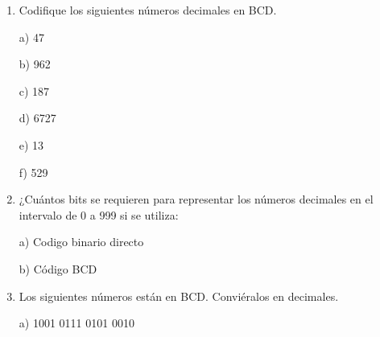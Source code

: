 \documentclass[a4paper, 12pt]{article}
\newcommand{\Aspace}{0.2cm}
\begin{document}
\begin{enumerate}
        \item Codifique los siguientes números decimales en BCD.
            \vspace{\Aspace} \par
            a) 47
            \\ { \color{azul}  }

            \vspace{\Aspace} \par
            b) 962
            \\ { \color{azul}  }

            \vspace{\Aspace} \par
            c) 187
            \\ { \color{azul}  }

            \vspace{\Aspace} \par
            d) 6727
            \\ { \color{azul}  }

            \vspace{\Aspace} \par
            e) 13
            \\ { \color{azul}  }

            \vspace{\Aspace} \par
            f) 529
            \\ { \color{azul}  }


        \item ¿Cuántos bits se requieren para representar los números decimales en el intervalo de 0 a 999 si se utiliza:
            \vspace{\Aspace} \par
            a) Codigo binario directo
            \\ { \color{azul}  }

            \vspace{\Aspace} \par
            b) Código BCD
            \\ { \color{azul}  }

 
        \item Los siguientes números están en BCD. Conviéralos en decimales.
            \vspace{\Aspace} \par
            a) 1001 0111 0101 0010
            \\ { \color{azul}  }


\end{enumerate}
\end{document}

